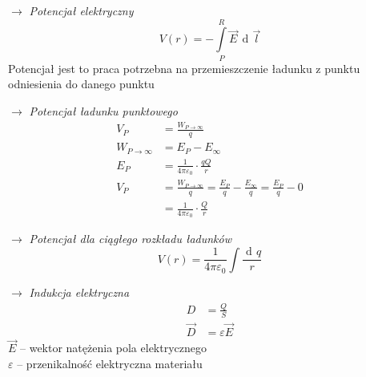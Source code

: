 \documentclass[12pt]{article}
\newenvironment{wzor}[1]{\par{\Large $\longrightarrow$ \textit{#1}}}
    {\newline {\color{grey} \rule{\linewidth}{0.3pt}}}
\DeclareMathOperator{\der}{\operatorname{d}\!}
\begin{document}
\begin{wzor}{Potencjał elektryczny}
    \begin{equation}
        V(r) = - \int\limits_P^R \Vec{E} \, \der\Vec{l}
    \end{equation}
    Potencjał jest to praca potrzebna na przemieszczenie ładunku z punktu odniesienia
    do danego punktu
\end{wzor}

\newpage

\begin{wzor}{Potencjał ładunku punktowego}
    \begin{equation}
        \begin{split}
            V_P &= \frac{W_{P \to \infty}}{q}\\
            W_{P \to \infty} &= E_P - E_\infty\\
            E_P &= \frac{1}{4\pi\varepsilon_0} \cdot \frac{qQ}{r}\\
            V_P &= \frac{W_{P \to \infty}}{q} = \frac{E_P}{q} - \frac{E_\infty}{q} = \frac{E_P}{q} - 0\\
            &= \frac{1}{4\pi\varepsilon_0} \cdot \frac{Q}{r}
        \end{split}
    \end{equation}
\end{wzor}

\begin{wzor}{Potencjał dla ciągłego rozkładu ładunków}
    \begin{equation}
        V(r) = \frac{1}{4\pi\varepsilon_0} \int \frac{\der q}{r}
    \end{equation}
\end{wzor}

\begin{wzor}{Indukcja elektryczna}
    \begin{align}
        D &= \frac{Q}{S}\\
        \Vec{D} &= \varepsilon \Vec{E}
    \end{align}
    $\Vec{E}$ -- wektor natężenia pola elektrycznego\\
    $\varepsilon$ -- przenikalność elektryczna materiału
\end{wzor}
\end{document}
